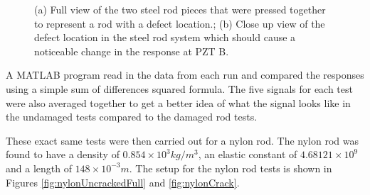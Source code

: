 \begin{figure}
\begin{subfigmatrix}{2}
\end{subfigmatrix}

   \caption
   { \label{fig:steelCrack}
(a) Full view of the two steel rod pieces that were pressed together to represent a rod with a defect location.;
(b) Close up view of the defect location in the steel rod system which should cause a noticeable change in the response at PZT B.
 }
   \end{figure}
   
A MATLAB program read in the data from each run and compared the responses using a simple sum of differences squared formula. The five signals for each test were also averaged together to get a better idea of what the signal looks like in the undamaged tests compared to the damaged rod tests.

These exact same tests were then carried out for a nylon rod. The nylon rod was found to have a density of $0.854 \times 10^3 kg/m^3$, an elastic constant of $4.68121 \times 10^9$ and a length of $148 \times 10^{-3} m$. The setup for the nylon rod tests is shown in Figures \ref{fig:nylonUncrackedFull} and \ref{fig:nylonCrack}.


